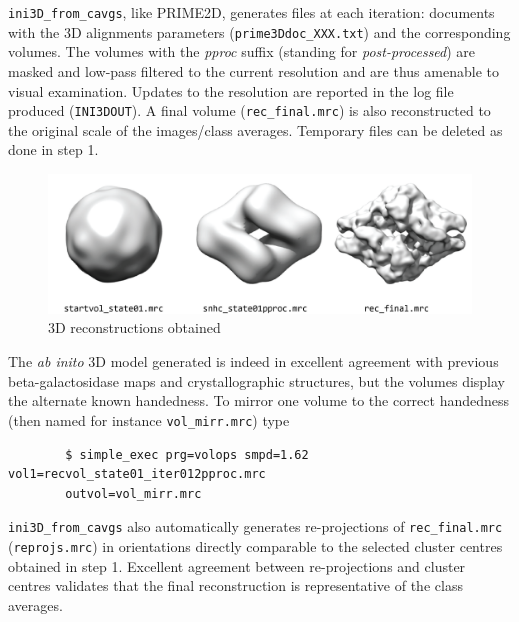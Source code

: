 \documentclass[a4paper,11pt]{article}
\begin{document}
\texttt{ini3D\_from\_cavgs}, like PRIME2D, generates files at each iteration: documents with the 3D alignments parameters (\texttt{prime3Ddoc\_XXX.txt}) and the corresponding volumes. The volumes with the \textit{pproc} suffix (standing for \textit{post-processed}) are masked and low-pass filtered to the current resolution and are thus amenable to visual examination. Updates to the resolution are reported in the log file produced (\texttt{INI3DOUT}). A final volume (\texttt{rec\_final.mrc}) is also reconstructed to the original scale of the images/class averages. Temporary files can be deleted as done in step 1.
\begin{figure}
\includegraphics[keepaspectratio=true,scale=0.6]{./bgal/bgal_maps}
\caption{3D reconstructions obtained}
\end{figure}
The \textit{ab inito} 3D model generated is indeed in excellent agreement with previous beta-galactosidase maps and crystallographic structures, but the volumes display the alternate known handedness. To mirror one volume to the correct handedness (then named for instance \texttt{vol\_mirr.mrc}) type
\begin{verbatim}
        $ simple_exec prg=volops smpd=1.62 vol1=recvol_state01_iter012pproc.mrc 
        outvol=vol_mirr.mrc
\end{verbatim}
\texttt{ini3D\_from\_cavgs} also automatically generates re-projections of \texttt{rec\_final.mrc} (\texttt{reprojs.mrc}) in orientations directly comparable to the selected cluster centres obtained in step 1. Excellent agreement between re-projections and cluster centres validates that the final reconstruction is representative of the class averages.
\end{document}
